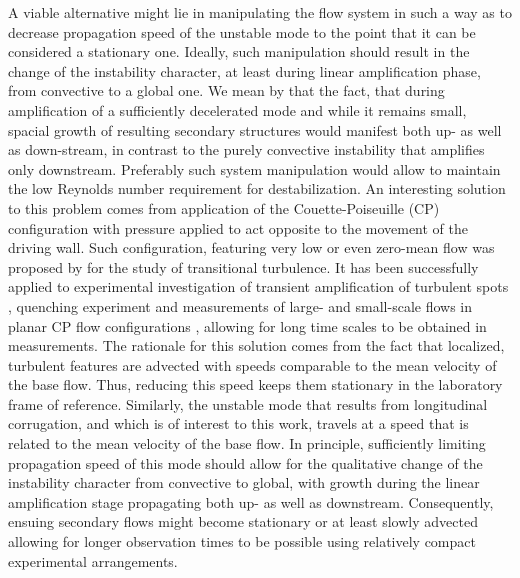 \documentclass[lineno]{jfm}
\begin{document}
A viable alternative might lie in manipulating the flow system in such a way as to decrease propagation speed of the unstable mode to the point that it can be considered a stationary one.
Ideally, such manipulation should result in the change of the instability character, at least during linear amplification phase, from convective to a global one.
We mean by that the fact, that during amplification of a sufficiently decelerated mode and while it remains small,
spacial growth of resulting secondary structures would manifest both up- as well as down-stream,
in contrast to the purely convective instability that amplifies only downstream.
Preferably such system manipulation would allow to maintain the low Reynolds number requirement for destabilization.
An interesting solution to this problem comes from application of the Couette-Poiseuille (CP) configuration with pressure applied to act opposite to the movement of the driving wall.
Such configuration, featuring very low or even zero-mean flow was proposed by \citet{Klotz_2017_prf} for the study of transitional turbulence.
It has been successfully applied to experimental investigation of transient amplification of turbulent spots \citep{Klotz_2017_jfm}, quenching experiment \citep{liu_klotz_2021} and measurements of large- and small-scale flows in planar CP flow configurations \citep{klotz2021experimental}, allowing for long time scales to be obtained in measurements.
The rationale for this solution comes from the fact that localized, turbulent features are advected with speeds comparable to the mean velocity of the base flow.
Thus, reducing this speed keeps them stationary in the laboratory frame of reference.
Similarly, the unstable mode that results from longitudinal corrugation, and which is of interest to this work, travels at a speed that is related to the mean velocity of the base flow.
In principle, sufficiently limiting propagation speed of this mode should allow for the qualitative change of the instability character from convective to global, with growth during the linear amplification stage propagating both up- as well as downstream.
Consequently, ensuing secondary flows might become stationary or at least slowly advected allowing for longer observation times to be possible using relatively compact experimental arrangements.
\end{document}
